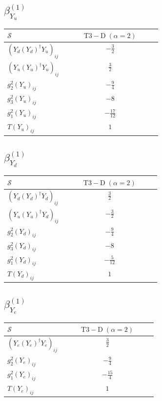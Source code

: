\documentclass[9pt]{article}
\begin{document}
\subsection*{$ \beta_{Y_u}^{(1)} $}
\begin{longtable}{@{}p{0.38\linewidth}c@{}}
\toprule
$\mathcal{S}$ & $ \mathrm{T3-D}\;(\alpha=2) $ \\
\midrule
$ (Y_d (Y_d)^{\dagger} Y_u)_{ij} $ & $ - \frac{3}{2} $ \\
$ (Y_u (Y_u)^{\dagger} Y_u)_{ij} $ & $ \frac{3}{2} $ \\
$ g_2^2 (Y_u)_{ij} $ & $ - \frac{9}{4} $ \\
$ g_3^2 (Y_u)_{ij} $ & $ -8 $ \\
$ g_1^2 (Y_u)_{ij} $ & $ - \frac{17}{12} $ \\
$ T (Y_u)_{ij} $ & $ 1 $ \\
\bottomrule
\end{longtable}
\subsection*{$ \beta_{Y_d}^{(1)} $}
\begin{longtable}{@{}p{0.38\linewidth}c@{}}
\toprule
$\mathcal{S}$ & $ \mathrm{T3-D}\;(\alpha=2) $ \\
\midrule
$ (Y_d (Y_d)^{\dagger} Y_d)_{ij} $ & $ \frac{3}{2} $ \\
$ (Y_u (Y_u)^{\dagger} Y_d)_{ij} $ & $ - \frac{3}{2} $ \\
$ g_2^2 (Y_d)_{ij} $ & $ - \frac{9}{4} $ \\
$ g_3^2 (Y_d)_{ij} $ & $ -8 $ \\
$ g_1^2 (Y_d)_{ij} $ & $ - \frac{5}{12} $ \\
$ T (Y_d)_{ij} $ & $ 1 $ \\
\bottomrule
\end{longtable}
\subsection*{$ \beta_{Y_e}^{(1)} $}
\begin{longtable}{@{}p{0.38\linewidth}c@{}}
\toprule
$\mathcal{S}$ & $ \mathrm{T3-D}\;(\alpha=2) $ \\
\midrule
$ (Y_e (Y_e)^{\dagger} Y_e)_{ij} $ & $ \frac{3}{2} $ \\
$ g_2^2 (Y_e)_{ij} $ & $ - \frac{9}{4} $ \\
$ g_1^2 (Y_e)_{ij} $ & $ - \frac{15}{4} $ \\
$ T (Y_e)_{ij} $ & $ 1 $ \\
\bottomrule
\end{longtable}
\end{document}
